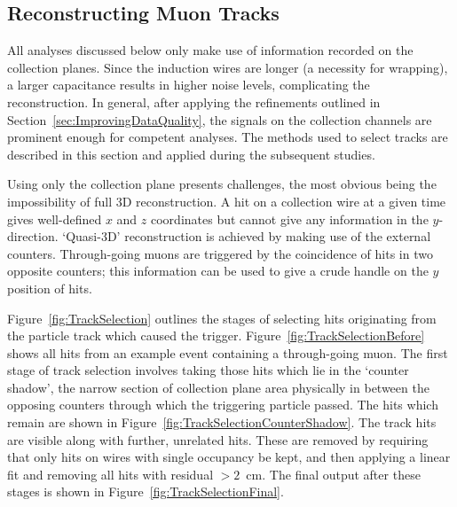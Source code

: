 \subsection{Reconstructing Muon Tracks}\label{sec:ReconstructingMuonTracks}

All analyses discussed below only make use of information recorded on the collection planes.  Since the induction wires are longer (a necessity for wrapping), a larger capacitance results in higher noise levels, complicating the reconstruction.  In general, after applying the refinements outlined in Section~\ref{sec:ImprovingDataQuality}, the signals on the collection channels are prominent enough for competent analyses.  The methods used to select tracks are described in this section and applied during the subsequent studies.

Using only the collection plane presents challenges, the most obvious being the impossibility of full 3D reconstruction.  A hit on a collection wire at a given time gives well-defined $x$ and $z$ coordinates but cannot give any information in the $y$-direction.  `Quasi-3D' reconstruction is achieved by making use of the external counters.  Through-going muons are triggered by the coincidence of hits in two opposite counters; this information can be used to give a crude handle on the $y$ position of hits.

Figure~\ref{fig:TrackSelection} outlines the stages of selecting hits originating from the particle track which caused the trigger.  Figure~\ref{fig:TrackSelectionBefore} shows all hits from an example event containing a through-going muon.  The first stage of track selection involves taking those hits which lie in the `counter shadow', the narrow section of collection plane area physically in between the opposing counters through which the triggering particle passed.  The hits which remain are shown in Figure~\ref{fig:TrackSelectionCounterShadow}.  The track hits are visible along with further, unrelated hits.  These are removed by requiring that only hits on wires with single occupancy be kept, and then applying a linear fit and removing all hits with residual $>2$~cm.  The final output after these stages is shown in Figure~\ref{fig:TrackSelectionFinal}.

